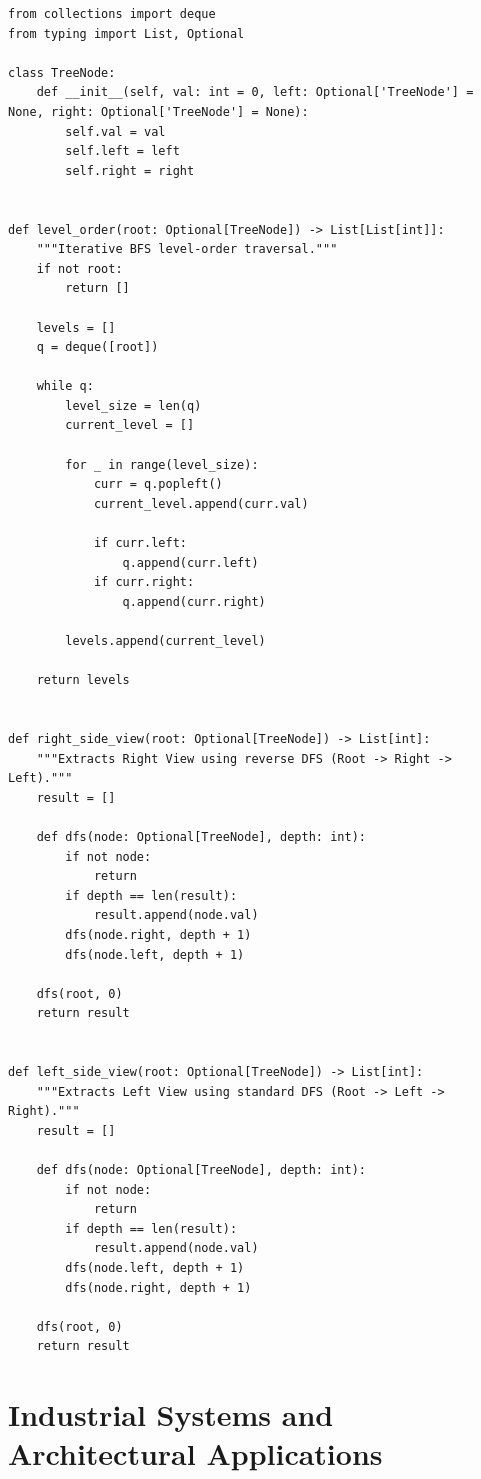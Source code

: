 \documentclass[10pt,journal,compsoc,onecolumn]{IEEEtran}
\begin{document}
\begin{verbatim}
from collections import deque
from typing import List, Optional

class TreeNode:
    def __init__(self, val: int = 0, left: Optional['TreeNode'] = None, right: Optional['TreeNode'] = None):
        self.val = val
        self.left = left
        self.right = right


def level_order(root: Optional[TreeNode]) -> List[List[int]]:
    """Iterative BFS level-order traversal."""
    if not root:
        return []

    levels = []
    q = deque([root])

    while q:
        level_size = len(q)
        current_level = []

        for _ in range(level_size):
            curr = q.popleft()
            current_level.append(curr.val)

            if curr.left:
                q.append(curr.left)
            if curr.right:
                q.append(curr.right)

        levels.append(current_level)

    return levels


def right_side_view(root: Optional[TreeNode]) -> List[int]:
    """Extracts Right View using reverse DFS (Root -> Right -> Left)."""
    result = []

    def dfs(node: Optional[TreeNode], depth: int):
        if not node:
            return
        if depth == len(result):
            result.append(node.val)
        dfs(node.right, depth + 1)
        dfs(node.left, depth + 1)

    dfs(root, 0)
    return result


def left_side_view(root: Optional[TreeNode]) -> List[int]:
    """Extracts Left View using standard DFS (Root -> Left -> Right)."""
    result = []

    def dfs(node: Optional[TreeNode], depth: int):
        if not node:
            return
        if depth == len(result):
            result.append(node.val)
        dfs(node.left, depth + 1)
        dfs(node.right, depth + 1)

    dfs(root, 0)
    return result
\end{verbatim}

\section{Industrial Systems and Architectural Applications}
\label{sec:systems}
\end{document}

